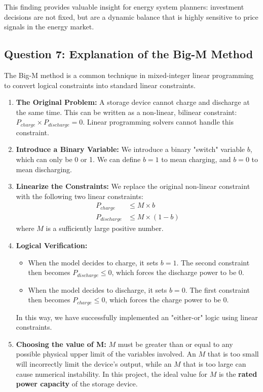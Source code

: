 \documentclass[12pt, a4paper]{article}
\begin{document}
This finding provides valuable insight for energy system planners: investment decisions are not fixed, but are a dynamic balance that is highly sensitive to price signals in the energy market.

\subsection{Question 7: Explanation of the Big-M Method}
The Big-M method is a common technique in mixed-integer linear programming to convert logical constraints into standard linear constraints.

\begin{enumerate}
	\item \textbf{The Original Problem:} A storage device cannot charge and discharge at the same time. This can be written as a non-linear, bilinear constraint: $P_{charge} \times P_{discharge} = 0$. Linear programming solvers cannot handle this constraint.
	\item \textbf{Introduce a Binary Variable:} We introduce a binary "switch" variable $b$, which can only be 0 or 1. We can define $b=1$ to mean charging, and $b=0$ to mean discharging.
	\item \textbf{Linearize the Constraints:} We replace the original non-linear constraint with the following two linear constraints:
	\begin{align*}
		P_{charge} & \leq M \times b \\
		P_{discharge} & \leq M \times (1 - b)
	\end{align*} 
	where $M$ is a sufficiently large positive number.
	\item \textbf{Logical Verification:}
	\begin{itemize}
		\item When the model decides to charge, it sets $b=1$. The second constraint then becomes $P_{discharge} \leq 0$, which forces the discharge power to be 0.
		\item When the model decides to discharge, it sets $b=0$. The first constraint then becomes $P_{charge} \leq 0$, which forces the charge power to be 0.
	\end{itemize}
	In this way, we have successfully implemented an "either-or" logic using linear constraints.
	\item \textbf{Choosing the value of M:} $M$ must be greater than or equal to any possible physical upper limit of the variables involved. An $M$ that is too small will incorrectly limit the device's output, while an $M$ that is too large can cause numerical instability. In this project, the ideal value for $M$ is the \textbf{rated power capacity} of the storage device.
\end{enumerate}
\end{document}
